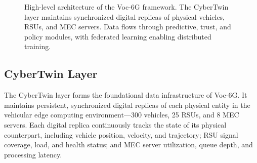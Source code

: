 \documentclass[journal,twoside]{IEEEtran}
\newcommand{\VocSixG}{Voc-6G}
\begin{document}
\begin{figure}[t]
{
}%
\caption{High-level architecture of the \VocSixG{} framework. The CyberTwin layer maintains synchronized digital replicas of physical vehicles, RSUs, and MEC servers. Data flows through predictive, trust, and policy modules, with federated learning enabling distributed training.}
\label{fig:architecture}
\end{figure}

\subsection{CyberTwin Layer}
\label{sec:cybertwin}

The CyberTwin layer forms the foundational data infrastructure of \VocSixG{}. It maintains persistent, synchronized digital replicas of each physical entity in the vehicular edge computing environment---300 vehicles, 25 RSUs, and 8 MEC servers. Each digital replica continuously tracks the state of its physical counterpart, including vehicle position, velocity, and trajectory; RSU signal coverage, load, and health status; and MEC server utilization, queue depth, and processing latency.
\end{document}
